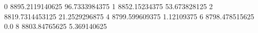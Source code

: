 0 8895.2119140625 96.7333984375
1 8852.15234375 53.673828125
2 8819.7314453125 21.2529296875
4 8799.599609375 1.12109375
6 8798.478515625 0.0
8 8803.84765625 5.369140625
